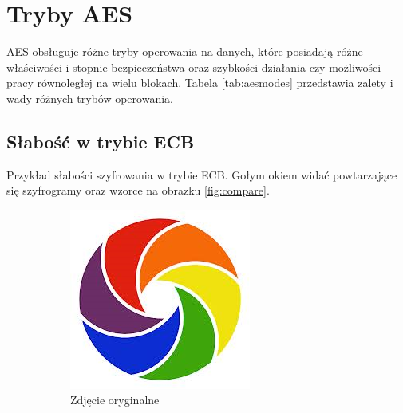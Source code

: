 \documentclass[a4paper,11pt]{article}
\theoremstyle{mytheor}
\begin{document}
\section*{Tryby AES}
AES obsługuje różne tryby operowania na danych, które posiadają różne właściwości i stopnie bezpieczeństwa oraz szybkości działania czy możliwości pracy równoległej na wielu blokach. Tabela \ref{tab:aesmodes} przedstawia zalety i wady różnych trybów operowania.

\subsection*{Słabość w trybie ECB}
Przykład słabości szyfrowania w trybie ECB. Gołym okiem widać powtarzające się szyfrogramy oraz wzorce na obrazku \ref{fig:compare}.

\begin{figure}[]
    \begin{subfigure}{0.33\textwidth}
        \includegraphics[width=1.0\linewidth]{logo_original.png}
        \caption{Zdjęcie oryginalne}
        \label{fig:original}
    \end{subfigure}
    \begin{subfigure}{0.33\textwidth}

\end{subfigure}
\end{figure}
\end{document}
